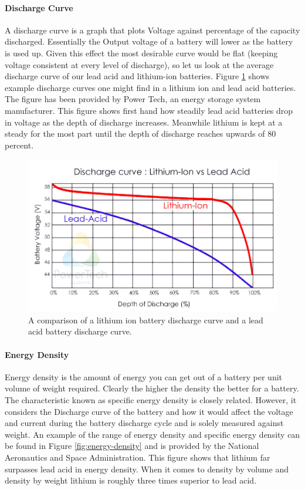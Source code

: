 \paragraph{Discharge Curve}
A discharge curve is a graph that plots Voltage against percentage of the capacity discharged. Essentially the Output voltage of a battery will lower as the battery is used up. Given this effect the most desirable curve would be flat (keeping voltage consistent at every level of discharge), so let us look at the average discharge curve of our lead acid and lithium-ion batteries. Figure \ref{fig:discharge-curve} shows example discharge curves one might find in a lithium ion and lead acid batteries. The figure has been provided by Power Tech, an energy storage system manufacturer. This figure shows first hand how steadily lead acid batteries drop in voltage as the depth of discharge increases. Meanwhile lithium is kept at a steady for the most part until the depth of discharge reaches upwards of 80 percent.

\begin{figure}
    \centering
    \includegraphics[scale=0.4]{figures/discharge curve.png}
    \caption{A comparison of a lithium ion battery discharge curve and a lead acid battery discharge curve.}
    \label{fig:discharge-curve} 
\end{figure}

\paragraph{Energy Density}
Energy density is the amount of energy you can get out of a battery per unit volume of weight required. Clearly the higher the density the better for a battery. The characteristic known as specific energy density is closely related. However, it considers the Discharge curve of the battery and how it would affect the voltage and current during the battery discharge cycle and is solely measured against weight. An example of the range of energy density and specific energy density can be found in Figure \ref{fig:energy-density} and is provided by the National Aeronautics and Space Administration. This figure shows that lithium far surpasses lead acid in energy density. When it comes to density by volume and density by weight lithium is roughly three times superior to lead acid.

